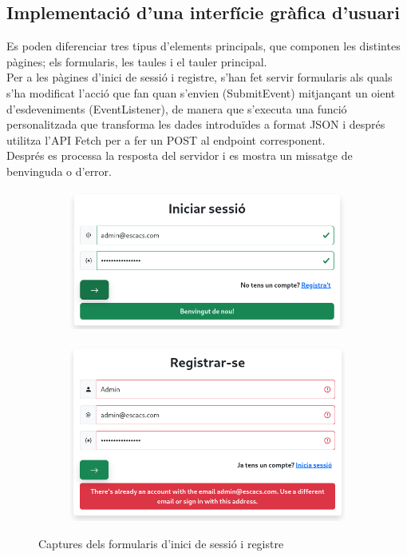 \subsection{Implementació d’una interfície gràfica d'usuari}
Es poden diferenciar tres tipus d'elements principals, que componen les distintes pàgines; els formularis, les taules i el tauler principal.
\\[3mm]
Per a les pàgines d'inici de sessió i registre, s'han fet servir formularis als quals s'ha modificat l'acció que fan quan s'envien (SubmitEvent) mitjançant un oient d'esdeveniments (EventListener), de manera que s'executa una funció personalitzada que transforma les dades introduïdes a format JSON i després utilitza l'API Fetch per a fer un POST al endpoint corresponent.
\\[3mm]
Després es processa la resposta del servidor i es mostra un missatge de benvinguda o d'error.
\begin{figure}[H]
     \centering
     \begin{subfigure}[b]{0.4\textwidth}
         \centering
         \includegraphics[width=\textwidth]{images/login-escacs.png}
         \label{fig:Login}
     \end{subfigure}
     \hspace{0.15\textwidth}
     \begin{subfigure}[b]{0.4\textwidth}
         \centering
         \includegraphics[width=\textwidth]{images/registre-escacs.png}
         \label{fig:Registre}
     \end{subfigure}
        \caption{Captures dels formularis d'inici de sessió i registre}
        \label{fig:Captures dels formularis d'inici de sessió i registre}
\end{figure}
